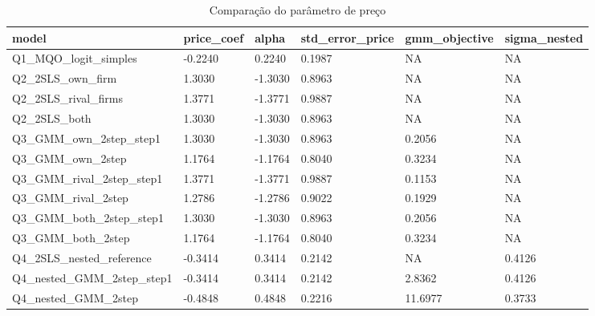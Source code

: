 \begin{table}[!htbp]
\centering
\caption{Comparação do parâmetro de preço}
\label{tab:price-compare}
\scriptsize
\begin{tabular}{llllll}
\hline
model & price\_coef & alpha & std\_error\_price & gmm\_objective & sigma\_nested
\\
\hline
Q1\_MQO\_logit\_simples & -0.2240 & 0.2240 & 0.1987 & NA & NA
\\
Q2\_2SLS\_own\_firm & 1.3030 & -1.3030 & 0.8963 & NA & NA
\\
Q2\_2SLS\_rival\_firms & 1.3771 & -1.3771 & 0.9887 & NA & NA
\\
Q2\_2SLS\_both & 1.3030 & -1.3030 & 0.8963 & NA & NA
\\
Q3\_GMM\_own\_2step\_step1 & 1.3030 & -1.3030 & 0.8963 & 0.2056 & NA
\\
Q3\_GMM\_own\_2step & 1.1764 & -1.1764 & 0.8040 & 0.3234 & NA
\\
Q3\_GMM\_rival\_2step\_step1 & 1.3771 & -1.3771 & 0.9887 & 0.1153 & NA
\\
Q3\_GMM\_rival\_2step & 1.2786 & -1.2786 & 0.9022 & 0.1929 & NA
\\
Q3\_GMM\_both\_2step\_step1 & 1.3030 & -1.3030 & 0.8963 & 0.2056 & NA
\\
Q3\_GMM\_both\_2step & 1.1764 & -1.1764 & 0.8040 & 0.3234 & NA
\\
Q4\_2SLS\_nested\_reference & -0.3414 & 0.3414 & 0.2142 & NA & 0.4126
\\
Q4\_nested\_GMM\_2step\_step1 & -0.3414 & 0.3414 & 0.2142 & 2.8362 & 0.4126
\\
Q4\_nested\_GMM\_2step & -0.4848 & 0.4848 & 0.2216 & 11.6977 & 0.3733
\\
\hline
\end{tabular}
\end{table}
